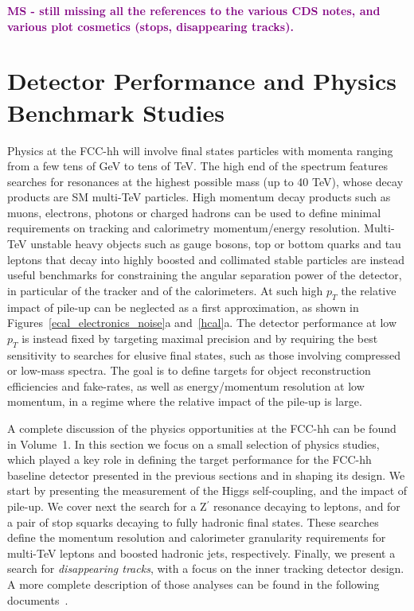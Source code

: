 \documentclass[11pt,twoside,a4paper]{cernrep}
\newcommand{\MS}[1]{\textbf{\textcolor{purple}{MS - #1}}}
\begin{document}

\MS{still missing all the references to the various CDS notes, and various plot cosmetics (stops, disappearing tracks).}

\section{Detector Performance and Physics Benchmark Studies}

Physics at the FCC-hh will involve final states particles with momenta ranging from a few tens of GeV to tens of TeV. The high end of the spectrum features searches for resonances at the highest possible mass (up to 40 TeV), whose decay products are SM multi-TeV particles. High momentum decay products such as muons, electrons, photons or charged hadrons can be used to define minimal requirements on tracking and calorimetry momentum/energy resolution. Multi-TeV unstable heavy objects such as gauge bosons, top or bottom quarks and tau leptons that decay into highly boosted and collimated stable particles are instead useful benchmarks for constraining the angular separation power of the detector, in particular of the tracker and of the calorimeters. At such high $p_{T}$ the relative impact of pile-up can be neglected as a first approximation, as shown in Figures~\ref{ecal_electronics_noise}a and~\ref{hcal}a. The detector performance at low $p_{T}$ is instead fixed by targeting maximal precision and by requiring the best sensitivity to searches for elusive final states, such as those involving compressed or low-mass spectra. The goal is to define targets for object reconstruction efficiencies and fake-rates, as well as energy/momentum resolution at low momentum, in a regime where the relative impact of the pile-up is large.

A complete discussion of the physics opportunities at the FCC-hh can be found in Volume~1. In this section we focus on a small selection of physics studies, which played a key role in defining the target performance for the FCC-hh baseline detector presented in the previous sections and in shaping its design. We start by presenting the measurement of the Higgs self-coupling, and the impact of pile-up. We cover next the search for a Z$^{\prime}$ resonance decaying to leptons, and for a pair of stop squarks decaying to fully hadronic final states. These searches define the momentum resolution and calorimeter granularity requirements for multi-TeV leptons and boosted hadronic jets, respectively. Finally, we present a search for \emph{disappearing tracks}, with a focus on the inner tracking detector design. A more complete description of those analyses can be found in the following documents~\cite{Selvaggi:2642471,Helsens:2642473,Gouskos:2642475,Terashi:2642474}.
\end{document}
